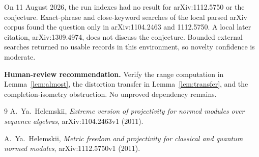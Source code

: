 \documentclass[11pt]{article}
\begin{document}
On 11 August 2026, the run indexes had no result for arXiv:1112.5750 or the
conjecture.  Exact-phrase and close-keyword searches of the local parsed arXiv
corpus found the question only in arXiv:1104.2463 and 1112.5750.  A local later
citation, arXiv:1309.4974, does not discuss the conjecture.  Bounded external
searches returned no usable records in this environment, so novelty confidence
is moderate.

\textbf{Human-review recommendation.}  Verify the range computation in
Lemma~\ref{lem:almost}, the distortion transfer in Lemma~\ref{lem:transfer},
and the completion-isometry obstruction.  No unproved dependency remains.

\begin{thebibliography}{9}
A.~Ya.~Helemskii,
\emph{Extreme version of projectivity for normed modules over sequence
algebras}, arXiv:1104.2463v1 (2011).

A.~Ya.~Helemskii,
\emph{Metric freedom and projectivity for classical and quantum normed
modules}, arXiv:1112.5750v1 (2011).
\end{thebibliography}
\end{document}

